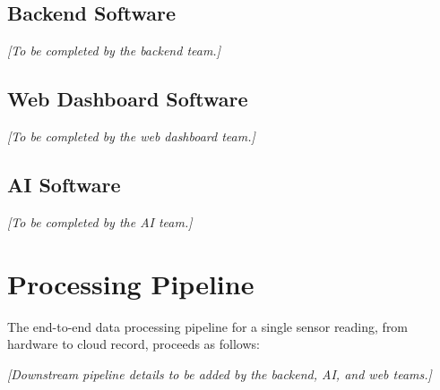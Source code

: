 \subsection*{Backend Software}
\begin{center}
	\textit{[To be completed by the backend team.]}
\end{center}

\subsection*{Web Dashboard Software}
\begin{center}
	\textit{[To be completed by the web dashboard team.]}
\end{center}

\subsection*{AI Software}
\begin{center}
	\textit{[To be completed by the AI team.]}
\end{center}

\section{Processing Pipeline}

The end-to-end data processing pipeline for a single sensor reading, from hardware
to cloud record, proceeds as follows:


\begin{center}
	\textit{[Downstream pipeline details to be added by the backend, AI, and web teams.]}
\end{center}
